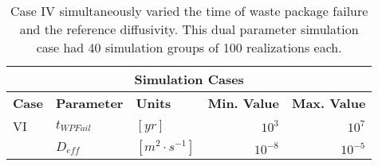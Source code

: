 \begin{table}[ht!]
\centering
\footnotesize{
\begin{tabular}{|l|l|l|r|r|}
\multicolumn{5}{c}{\textbf{Simulation Cases}}\\
\hline
\textbf{Case} & \textbf{Parameter} & \textbf{Units} & \textbf{Min. Value} & \textbf{Max. Value}\\
\hline 
VI    & $t_{WPFail}$        & $[yr]$         & $10^3$    &  $10^7$ \\
      & $D_{eff}$           & $[m^2\cdot s^{-1}]$       & $10^{-8}$    &  $10^{-5}$ \\
\hline
\end{tabular}
\caption{Case IV simultaneously varied the time of waste package failure and the 
  reference diffusivity. This dual parameter simulation case had 40 simulation 
groups of 100 realizations each.}
\label{tab:Cases}
}
\end{table}

